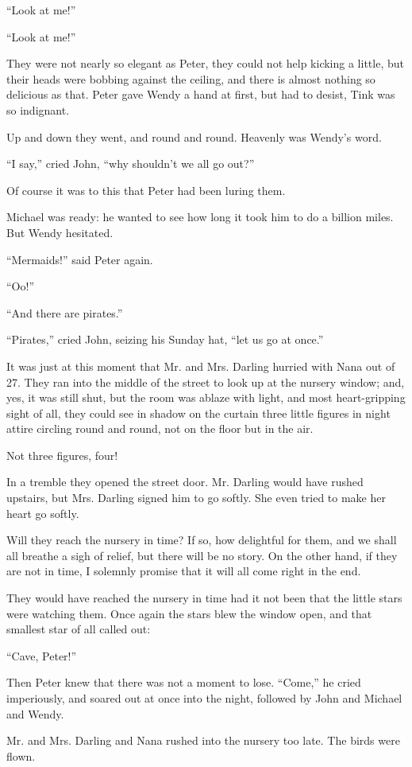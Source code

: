 ``Look at me!''

``Look at me!''

They were not nearly so elegant as Peter, they could not help kicking a
little, but their heads were bobbing against the ceiling, and there is
almost nothing so delicious as that. Peter gave Wendy a hand at first,
but had to desist, Tink was so indignant.

Up and down they went, and round and round. Heavenly was Wendy's word.

``I say,'' cried John, ``why shouldn't we all go out?''

Of course it was to this that Peter had been luring them.

Michael was ready: he wanted to see how long it took him to do a
billion miles. But Wendy hesitated.

``Mermaids!'' said Peter again.

``Oo!''

``And there are pirates.''

``Pirates,'' cried John, seizing his Sunday hat, ``let us go at once.''

It was just at this moment that Mr. and Mrs. Darling hurried with Nana
out of 27. They ran into the middle of the street to look up at the
nursery window; and, yes, it was still shut, but the room was ablaze
with light, and most heart-gripping sight of all, they could see in
shadow on the curtain three little figures in night attire circling
round and round, not on the floor but in the air.

Not three figures, four!

In a tremble they opened the street door. Mr. Darling would have rushed
upstairs, but Mrs. Darling signed him to go softly. She even tried to
make her heart go softly.

Will they reach the nursery in time? If so, how delightful for them,
and we shall all breathe a sigh of relief, but there will be no story.
On the other hand, if they are not in time, I solemnly promise that it
will all come right in the end.

They would have reached the nursery in time had it not been that the
little stars were watching them. Once again the stars blew the window
open, and that smallest star of all called out:

``Cave, Peter!''

Then Peter knew that there was not a moment to lose. ``Come,'' he cried
imperiously, and soared out at once into the night, followed by John
and Michael and Wendy.

Mr. and Mrs. Darling and Nana rushed into the nursery too late. The
birds were flown.